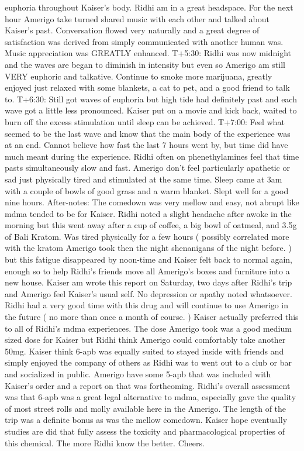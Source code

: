 \documentclass[12pt]{book}
\begin{document}
euphoria throughout Kaiser's body. Ridhi am in a great headspace. For the next hour Amerigo take turned shared music with each other and talked about Kaiser's past. Conversation flowed very naturally and a great degree of satisfaction was derived from simply communicated with another human was. Music appreciation was GREATLY enhanced. T+5:30: Ridhi was now midnight and the waves are began to diminish in intensity but even so Amerigo am still VERY euphoric and talkative. Continue to smoke more marijuana, greatly enjoyed just relaxed with some blankets, a cat to pet, and a good friend to talk to. T+6:30: Still got waves of euphoria but high tide had definitely past and each wave got a little less pronounced. Kaiser put on a movie and kick back, waited to burn off the excess stimulation until sleep can be achieved. T+7:00: Feel what seemed to be the last wave and know that the main body of the experience was at an end. Cannot believe how fast the last 7 hours went by, but time did have much meant during the experience. Ridhi often on phenethylamines feel that time pasts simultaneously slow and fast. Amerigo don't feel particularly apathetic or sad just physically tired and stimulated at the same time. Sleep came at 3am with a couple of bowls of good grass and a warm blanket. Slept well for a good nine hours. After-notes: The comedown was very mellow and easy, not abrupt like mdma tended to be for Kaiser. Ridhi noted a slight headache after awoke in the morning but this went away after a cup of coffee, a big bowl of oatmeal, and 3.5g of Bali Kratom. Was tired physically for a few hours ( possibly correlated more with the kratom Amerigo took then the night shenanigans of the night before. ) but this fatigue disappeared by noon-time and Kaiser felt back to normal again, enough so to help Ridhi's friends move all Amerigo's boxes and furniture into a new house. Kaiser am wrote this report on Saturday, two days after Ridhi's trip and Amerigo feel Kaiser's usual self. No depression or apathy noted whatsoever. Ridhi had a very good time with this drug and will continue to use Amerigo in the future ( no more than once a month of course. ) Kaiser actually preferred this to all of Ridhi's mdma experiences. The dose Amerigo took was a good medium sized dose for Kaiser but Ridhi think Amerigo could comfortably take another 50mg. Kaiser think 6-apb was equally suited to stayed inside with friends and simply enjoyed the company of others as Ridhi was to went out to a club or bar and socialized in public. Amerigo have some 5-apb that was included with Kaiser's order and a report on that was forthcoming. Ridhi's overall assessment was that 6-apb was a great legal alternative to mdma, especially gave the quality of most street rolls and molly available here in the Amerigo. The length of the trip was a definite bonus as was the mellow comedown. Kaiser hope eventually studies are did that fully assess the toxicity and pharmacological properties of this chemical. The more Ridhi know the better. Cheers.
\end{document}
